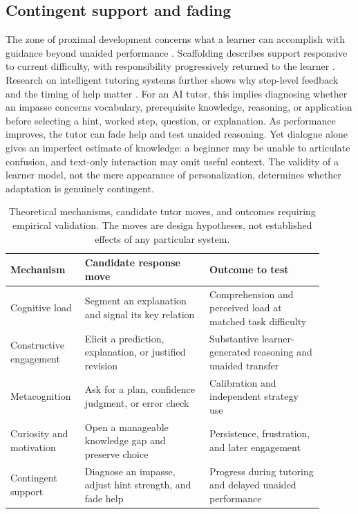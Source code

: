 \documentclass[11pt,a4paper]{article}
\begin{document}
\subsection{Contingent support and fading}
The zone of proximal development concerns what a learner can accomplish with guidance beyond unaided performance \cite{T07}. Scaffolding describes support responsive to current difficulty, with responsibility progressively returned to the learner \cite{T08}. Research on intelligent tutoring systems further shows why step-level feedback and the timing of help matter \cite{T09}. For an AI tutor, this implies diagnosing whether an impasse concerns vocabulary, prerequisite knowledge, reasoning, or application before selecting a hint, worked step, question, or explanation. As performance improves, the tutor can fade help and test unaided reasoning. Yet dialogue alone gives an imperfect estimate of knowledge: a beginner may be unable to articulate confusion, and text-only interaction may omit useful context. The validity of a learner model, not the mere appearance of personalization, determines whether adaptation is genuinely contingent.

\begin{table}[ht]
\centering
\small
\caption{Theoretical mechanisms, candidate tutor moves, and outcomes requiring empirical validation. The moves are design hypotheses, not established effects of any particular system.}
\label{tab:mechanisms}
\begin{tabular}{p{0.19\linewidth}p{0.37\linewidth}p{0.34\linewidth}}
\toprule
Mechanism & Candidate response move & Outcome to test \\
\midrule
Cognitive load & Segment an explanation and signal its key relation & Comprehension and perceived load at matched task difficulty \\
Constructive engagement & Elicit a prediction, explanation, or justified revision & Substantive learner-generated reasoning and unaided transfer \\
Metacognition & Ask for a plan, confidence judgment, or error check & Calibration and independent strategy use \\
Curiosity and motivation & Open a manageable knowledge gap and preserve choice & Persistence, frustration, and later engagement \\
Contingent support & Diagnose an impasse, adjust hint strength, and fade help & Progress during tutoring and delayed unaided performance \\
\bottomrule
\end{tabular}
\end{table}
\end{document}
